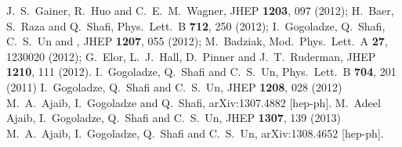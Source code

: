 \documentclass[12pt]{article}
\begin{document}
\begin{thebibliography}{99}
  J.~S.~Gainer, R.~Huo and C.~E.~M.~Wagner,
    JHEP {\bf 1203}, 097 (2012);
H.~Baer, S.~Raza and Q.~Shafi,
  Phys.\ Lett.\ B {\bf 712}, 250 (2012);
  I.~Gogoladze, Q.~Shafi, C.~S.~Un and ,
  JHEP {\bf 1207}, 055 (2012);
  M.~Badziak,
  Mod.\ Phys.\ Lett.\ A {\bf 27}, 1230020 (2012);
  G.~Elor, L.~J.~Hall, D.~Pinner and  J.~T.~Ruderman,
  JHEP {\bf 1210}, 111 (2012).
  I.~Gogoladze, Q.~Shafi and C.~S.~Un,
  Phys.\ Lett.\ B {\bf 704}, 201 (2011)
  I.~Gogoladze, Q.~Shafi and C.~S.~Un,
  JHEP {\bf 1208}, 028 (2012)
  M.~A.~Ajaib, I.~Gogoladze and Q.~Shafi,
  arXiv:1307.4882 [hep-ph].
  M.~Adeel Ajaib, I.~Gogoladze, Q.~Shafi and C.~S.~Un,
  JHEP {\bf 1307}, 139 (2013)
  M.~A.~Ajaib, I.~Gogoladze, Q.~Shafi and C.~S.~Un,
  arXiv:1308.4652 [hep-ph].
  

\end{thebibliography}
\end{document}
